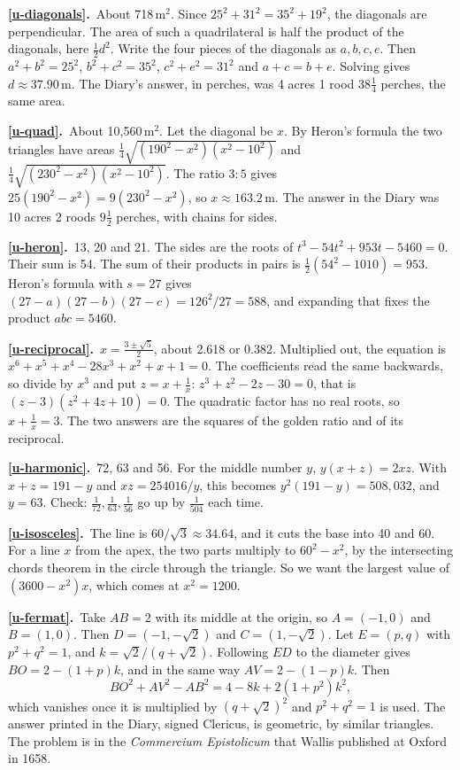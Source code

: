 \documentclass[11pt,a4paper]{article}
\newcounter{prob}
\newcommand{\ans}[2]{\par\smallskip\noindent\textbf{\ref{#1}.}\ #2}
\begin{document}
\ans{u-diagonals}{About 718\,m$^2$. Since $25^2 + 31^2 = 35^2 + 19^2$, the diagonals are
perpendicular. The area of such a quadrilateral is half the product of the diagonals,
here $\tfrac12d^2$. Write the four pieces of the diagonals as $a, b, c, e$. Then
$a^2 + b^2 = 25^2$, $b^2 + c^2 = 35^2$, $c^2 + e^2 = 31^2$ and $a + c = b + e$. Solving
gives $d \approx 37.90$\,m. The Diary's answer, in perches, was 4 acres 1 rood
$38\tfrac14$ perches, the same area.}
\ans{u-quad}{About 10,560\,m$^2$. Let the diagonal be $x$. By Heron's formula the two
triangles have areas
$\tfrac14\sqrt{(190^2 - x^2)(x^2 - 10^2)}$ and $\tfrac14\sqrt{(230^2 - x^2)(x^2 - 10^2)}$.
The ratio $3:5$ gives $25(190^2 - x^2) = 9(230^2 - x^2)$, so $x \approx 163.2$\,m. The
answer in the Diary was 10 acres 2 roods $9\tfrac12$ perches, with chains for sides.}
\ans{u-heron}{13, 20 and 21. The sides are the roots of $t^3 - 54t^2 + 953t - 5460 = 0$.
Their sum is 54. The sum of their products in pairs is $\tfrac12(54^2 - 1010) = 953$.
Heron's formula with $s = 27$ gives $(27 - a)(27 - b)(27 - c) = 126^2/27 = 588$, and
expanding that fixes the product $abc = 5460$.}
\ans{u-reciprocal}{$x = \tfrac{3\pm\sqrt5}{2}$, about 2.618 or 0.382. Multiplied out,
the equation is $x^6 + x^5 + x^4 - 28x^3 + x^2 + x + 1 = 0$. The coefficients read the
same backwards, so divide by $x^3$ and put $z = x + \tfrac1x$:
$z^3 + z^2 - 2z - 30 = 0$, that is $(z - 3)(z^2 + 4z + 10) = 0$. The quadratic factor has
no real roots, so $x + \tfrac1x = 3$. The two answers are the squares of the golden ratio
and of its reciprocal.}
\ans{u-harmonic}{72, 63 and 56. For the middle number $y$, $y(x + z) = 2xz$. With
$x + z = 191 - y$ and $xz = 254016/y$, this becomes $y^2(191 - y) = 508{,}032$, and
$y = 63$. Check: $\tfrac1{72}, \tfrac1{63}, \tfrac1{56}$ go up by $\tfrac1{504}$ each time.}
\ans{u-isosceles}{The line is $60/\sqrt3 \approx 34.64$, and it cuts the base into 40 and
60. For a line $x$ from the apex, the two parts multiply to $60^2 - x^2$, by the
intersecting chords theorem in the circle through the triangle. So we want the largest
value of $(3600 - x^2)x$, which comes at $x^2 = 1200$.}
\ans{u-fermat}{Take $AB = 2$ with its middle at the origin, so $A = (-1,0)$ and
$B = (1,0)$. Then $D = (-1,-\sqrt2)$ and $C = (1,-\sqrt2)$. Let $E = (p,q)$ with
$p^2 + q^2 = 1$, and $k = \sqrt2/(q + \sqrt2)$. Following $ED$ to the diameter gives
$BO = 2 - (1 + p)k$, and in the same way $AV = 2 - (1 - p)k$. Then
\[
BO^2 + AV^2 - AB^2 = 4 - 8k + 2(1 + p^2)k^2,
\]
which vanishes once it is multiplied by $(q + \sqrt2)^2$ and $p^2 + q^2 = 1$ is used. The
answer printed in the Diary, signed Clericus, is geometric, by similar triangles. The
problem is in the \textit{Commercium Epistolicum} that Wallis published at Oxford in
1658.}
\end{document}
